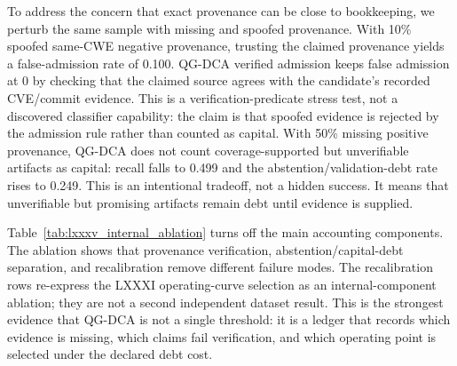 ﻿\documentclass[lettersize,journal]{IEEEtran}
\begin{document}
To address the concern that exact provenance can be close to bookkeeping, we perturb the same sample with missing and spoofed provenance. With 10\% spoofed same-CWE negative provenance, trusting the claimed provenance yields a false-admission rate of 0.100. QG-DCA verified admission keeps false admission at 0 by checking that the claimed source agrees with the candidate's recorded CVE/commit evidence. This is a verification-predicate stress test, not a discovered classifier capability: the claim is that spoofed evidence is rejected by the admission rule rather than counted as capital. With 50\% missing positive provenance, QG-DCA does not count coverage-supported but unverifiable artifacts as capital: recall falls to 0.499 and the abstention/validation-debt rate rises to 0.249. This is an intentional tradeoff, not a hidden success. It means that unverifiable but promising artifacts remain debt until evidence is supplied.

Table~\ref{tab:lxxxv_internal_ablation} turns off the main accounting components. The ablation shows that provenance verification, abstention/capital-debt separation, and recalibration remove different failure modes. The recalibration rows re-express the LXXXI operating-curve selection as an internal-component ablation; they are not a second independent dataset result. This is the strongest evidence that QG-DCA is not a single threshold: it is a ledger that records which evidence is missing, which claims fail verification, and which operating point is selected under the declared debt cost.
\end{document}
